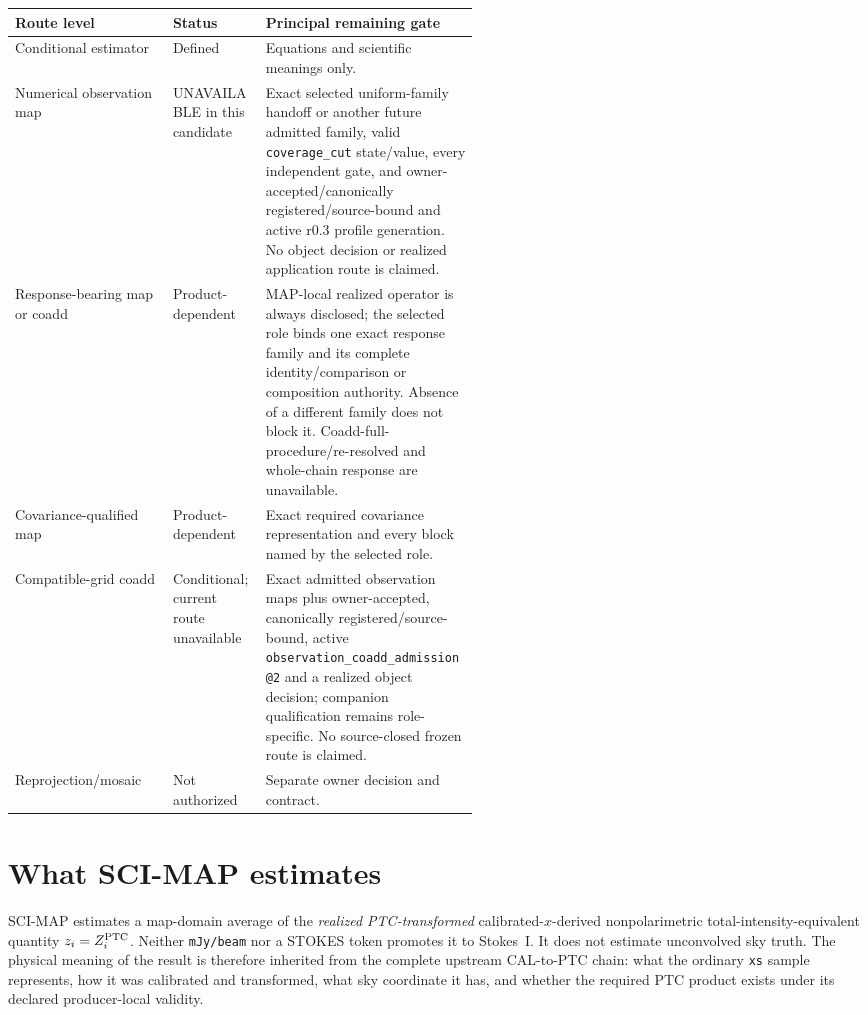 \documentclass[10pt]{article}
\newcommand{\code}[1]{\nolinkurl{#1}}
\begin{document}
\begin{center}\small
\begin{tabularx}{0.96\linewidth}{@{}L{0.34\linewidth}L{0.20\linewidth}Y@{}}
\toprule Route level & Status & Principal remaining gate \\
\midrule
Conditional estimator & Defined & Equations and scientific meanings only.\\
Numerical observation map & UNAVAILABLE in this candidate & Exact selected uniform-family handoff or another future admitted family, valid \code{coverage_cut} state/value, every independent gate, and owner-accepted/canonically registered/source-bound and active r0.3 profile generation. No object decision or realized application route is claimed.\\
Response-bearing map or coadd & Product-dependent & MAP-local realized operator is always disclosed; the selected role binds one exact response family and its complete identity/comparison or composition authority. Absence of a different family does not block it. Coadd-full-procedure/re-resolved and whole-chain response are unavailable.\\
Covariance-qualified map & Product-dependent & Exact required covariance representation and every block named by the selected role.\\
Compatible-grid coadd & Conditional; current route unavailable & Exact admitted observation maps plus owner-accepted, canonically registered/source-bound, active \code{observation_coadd_admission@2} and a realized object decision; companion qualification remains role-specific. No source-closed frozen route is claimed.\\
Reprojection/mosaic & Not authorized & Separate owner decision and contract.\\
\bottomrule
\end{tabularx}
\end{center}

\SCIMapLifecycleDefinition

\SCIMapLifecycleTable

\SCIMapAxisSeparationDefinition

\SCIMapLifecycleAssumption

\tableofcontents

\clearpage
\section{What SCI-MAP estimates}\label{sec:estimand}
SCI-MAP estimates a map-domain average of the \emph{realized PTC-transformed}
calibrated-\(x\)-derived nonpolarimetric total-intensity-equivalent quantity
\(z_i=Z_i^{\rm PTC}\). Neither \code{mJy/beam} nor a STOKES token promotes it
to Stokes~I. It does not estimate unconvolved sky truth. The physical
meaning of the result is therefore inherited from the complete upstream
CAL-to-PTC chain: what the ordinary \code{xs} sample represents, how it was
calibrated and transformed, what sky coordinate it has, and whether the
required PTC product exists under its declared producer-local validity.
\end{document}
